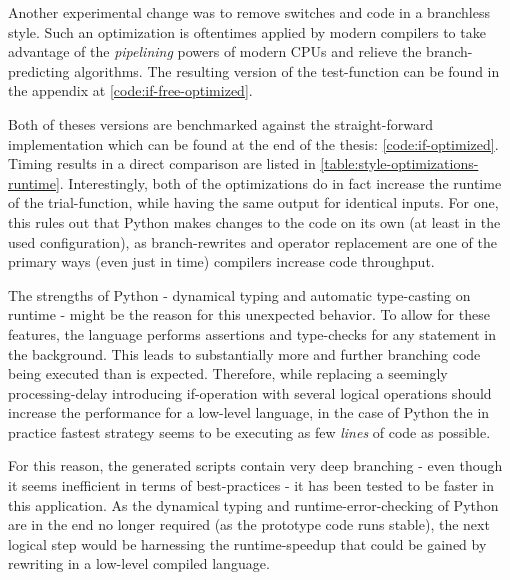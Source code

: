 Another experimental change was to remove switches and code in a branchless style.
Such an optimization is oftentimes applied by modern compilers to take advantage of the \emph{pipelining} powers of modern CPUs and relieve the branch-predicting algorithms.
The resulting version of the test-function can be found in the appendix at \ref{code:if-free-optimized}.

Both of theses versions are benchmarked against the straight-forward implementation which can be found at the end of the thesis: \ref{code:if-optimized}.
Timing results in a direct comparison are listed in \autoref{table:style-optimizations-runtime}.
Interestingly, both of the \glqq optimizations\grqq{} do in fact increase the runtime of the trial-function, while having the same output for identical inputs.
For one, this rules out that Python makes changes to the code on its own (at least in the used configuration), as branch-rewrites and operator replacement are one of the primary ways (even just in time) compilers increase code throughput.

The strengths of Python - dynamical typing and automatic type-casting on runtime - might be the reason for this unexpected behavior.
To allow for these features, the language performs assertions and type-checks for any statement in the background.
This leads to substantially more and further branching code being executed than is expected.
Therefore, while replacing a seemingly processing-delay introducing if-operation with several logical operations should increase the performance for a low-level language, in the case of Python the in practice fastest strategy seems to be executing as few \emph{lines} of code as possible.

For this reason, the generated scripts contain very deep branching - even though it seems inefficient in terms of best-practices - it has been tested to be faster in this application.
As the dynamical typing and runtime-error-checking of Python are in the end no longer required (as the prototype code runs stable), the next logical step would be harnessing the runtime-speedup that could be gained by rewriting in a low-level compiled language.